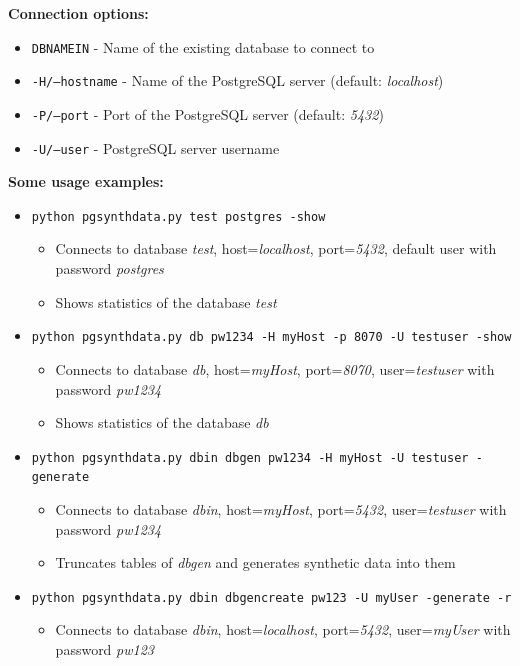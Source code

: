 \textbf{Connection options:}
\begin{itemize}
\item \texttt{DBNAMEIN} - Name of the existing database to connect to
\item \texttt{-H/--hostname} - Name of the PostgreSQL server (default: \textit{localhost})
\item \texttt{-P/--port} - Port of the PostgreSQL server (default: \textit{5432})
\item \texttt{-U/--user} - PostgreSQL server username
\newline
\end{itemize}
\textbf{Some usage examples:}
\begin{itemize}
	\item \texttt{python pgsynthdata.py test postgres -show}
	\begin{itemize}
		\item Connects to database \textit{test}, host=\textit{localhost}, port=\textit{5432}, default user with password \textit{postgres}
		\item Shows statistics of the database \textit{test}
	\end{itemize}
	\item \texttt{python pgsynthdata.py db pw1234 -H myHost -p 8070 -U testuser -show}
	\begin{itemize}
		\item Connects to database \textit{db}, host=\textit{myHost}, port=\textit{8070}, user=\textit{testuser} with password \textit{pw1234}
		\item Shows statistics of the database \textit{db}
	\end{itemize}
	\item \texttt{python pgsynthdata.py dbin dbgen pw1234 -H myHost -U testuser -generate}
	\begin{itemize}
		\item Connects to database \textit{dbin}, host=\textit{myHost}, port=\textit{5432}, user=\textit{testuser} with password \textit{pw1234}
		\item Truncates tables of \textit{dbgen} and generates synthetic data into them
	\end{itemize}
	\item \texttt{python pgsynthdata.py dbin dbgencreate pw123 -U myUser -generate -r}
	\begin{itemize}
		\item Connects to database \textit{dbin}, host=\textit{localhost}, port=\textit{5432}, user=\textit{myUser} with password \textit{pw123}

\end{itemize}
\end{itemize}
